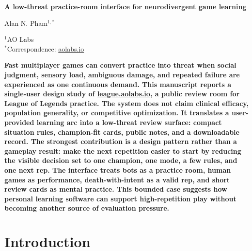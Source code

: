 \documentclass[12pt,letterpaper]{article}
\begin{document}
\linenumbers
\thispagestyle{empty}

\begin{center}
    \vspace*{-0.6em}

    {\fontsize{20}{22}\selectfont\bfseries\color{SumiInk}
    A low-threat practice-room interface for neurodivergent game learning\par}

    \vspace{0.95em}

    {\normalsize\color{SumiInk}
    Alan N. Pham$^{1,*}$\par}

    \vspace{0.38em}

    {\small\color{DustyTaupe}
    $^{1}$AO Labs\\
    $^{*}$Correspondence: \href{https://aolabs.io}{aolabs.io}\par}
\end{center}

\vspace{0.35em}
\noindent\textbf{Fast multiplayer games can convert practice into threat when social judgment, sensory load, ambiguous damage, and repeated failure are experienced as one continuous demand. This manuscript reports a single-user design study of \href{https://league.aolabs.io}{league.aolabs.io}, a public review room for League of Legends practice. The system does not claim clinical efficacy, population generality, or competitive optimization. It translates a user-provided learning arc into a low-threat review surface: compact situation rules, champion-fit cards, public notes, and a downloadable record. The strongest contribution is a design pattern rather than a gameplay result: make the next repetition easier to start by reducing the visible decision set to one champion, one mode, a few rules, and one next rep. The interface treats bots as a practice room, human games as performance, death-with-intent as a valid rep, and short review cards as mental practice. This bounded case suggests how personal learning software can support high-repetition play without becoming another source of evaluation pressure.}

\newpage
\pagestyle{fancy}

\section{Introduction}
\end{document}
